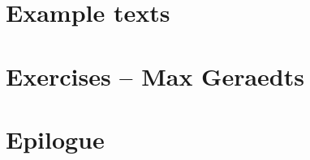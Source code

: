 \documentclass[twoside, openany, 12pt, a5paper]{book}
\begin{document}
\chapter{Example texts}

\chapter{Exercises -- {\small Max Geraedts}} 
\backmatter

\chapter{Epilogue}




%
\end{document}

